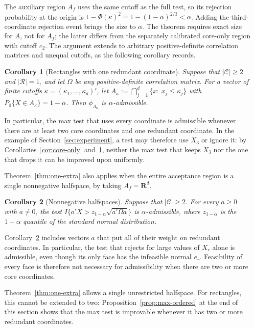 \documentclass[11pt]{article}
\newcommand{\red}[1]{{\color{red}#1}} %
\numberwithin{equation}{section}
\newtheorem{corollary}{Corollary}
\theoremstyle{definition}
\begin{document}
The auxiliary region $A_f$ uses the same cutoff as the full test, so its rejection probability at the origin is $1-\Phi(\kappa)^2=1-(1-\alpha)^{2/3}<\alpha$. Adding the third-coordinate rejection event brings the size to $\alpha$. The theorem requires exact size for $A$, not for $A_f$; the latter differs from the separately calibrated core-only region with cutoff $c_2$. The argument extends to arbitrary positive-definite correlation matrices and unequal cutoffs, as the following corollary records.

\begin{corollary}[Rectangles with one redundant coordinate]\label{cor:rectangles}
Suppose that $|\mathcal C|\ge2$ and $|\mathcal R|=1$, and let $\Omega$ be any positive-definite correlation matrix. For a vector of finite cutoffs $\kappa=(\kappa_1,\dots,\kappa_d)'$, let $A_\kappa:=\bigcap_{j=1}^d\{x:\ x_j\le\kappa_j\}$ with $P_0\{X\in A_\kappa\}=1-\alpha$. Then $\phi_{A_\kappa}$ is $\alpha$-admissible.
\end{corollary}

In particular, the max test that uses every coordinate is admissible whenever there are at least two core coordinates and one redundant coordinate. In the example of Section~\ref{sec:experiment}, a test may therefore use $X_3$ or ignore it: by Corollaries~\ref{cor:core-only} and~\ref{cor:rectangles}, neither the max test that keeps $X_3$ nor the one that drops it can be improved upon uniformly.

Theorem~\ref{thm:one-extra} also applies when the entire acceptance region is a single nonnegative halfspace, by taking $A_f=\mathbf R^d$.

\begin{corollary}[Nonnegative halfspaces]\label{cor:halfspace}
Suppose that $|\mathcal C|\ge2$. For every $a\ge0$ with $a\ne0$, the test $I\{a'X>z_{1-\alpha}\sqrt{a'\Omega a}\}$ is $\alpha$-admissible, where $z_{1-\alpha}$ is the $1-\alpha$ quantile of the standard normal distribution.
\end{corollary}

Corollary~\ref{cor:halfspace} includes vectors $a$ that put all of their weight on redundant coordinates. In particular, the test that rejects for large values of $X_r$ alone is admissible, even though its only face has the infeasible normal $e_r$. Feasibility of every face is therefore not necessary for admissibility when there are two or more core coordinates.

\red{Theorem~\ref{thm:one-extra} allows a single unrestricted halfspace. For rectangles, this cannot be extended to two: Proposition~\ref{prop:max-ordered} at the end of this section shows that the max test is improvable whenever it has two or more redundant coordinates.}
\end{document}
